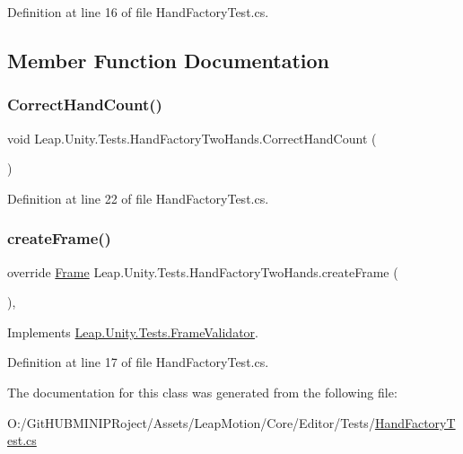 Definition at line 16 of file Hand\+Factory\+Test.\+cs.



\subsection{Member Function Documentation}
\mbox{\label{class_leap_1_1_unity_1_1_tests_1_1_hand_factory_two_hands_acf5d61eadd85814d90e0dd53b014fd6f}} 
\subsubsection{\texorpdfstring{CorrectHandCount()}{CorrectHandCount()}}
{\footnotesize\ttfamily void Leap.\+Unity.\+Tests.\+Hand\+Factory\+Two\+Hands.\+Correct\+Hand\+Count (\begin{DoxyParamCaption}{ }\end{DoxyParamCaption})}



Definition at line 22 of file Hand\+Factory\+Test.\+cs.

\mbox{\label{class_leap_1_1_unity_1_1_tests_1_1_hand_factory_two_hands_ab929744527e15f0ad07ff17d0e867355}} 
\subsubsection{\texorpdfstring{createFrame()}{createFrame()}}
{\footnotesize\ttfamily override \mbox{\hyperlink{class_leap_1_1_frame}{Frame}} Leap.\+Unity.\+Tests.\+Hand\+Factory\+Two\+Hands.\+create\+Frame (\begin{DoxyParamCaption}{ }\end{DoxyParamCaption})\hspace{0.3cm}{\ttfamily [protected]}, {\ttfamily [virtual]}}



Implements \mbox{\hyperlink{class_leap_1_1_unity_1_1_tests_1_1_frame_validator_ae397067480c6fd2183160f048094e466}{Leap.\+Unity.\+Tests.\+Frame\+Validator}}.



Definition at line 17 of file Hand\+Factory\+Test.\+cs.



The documentation for this class was generated from the following file\+:\begin{DoxyCompactItemize}
\item 
O\+:/\+Git\+H\+U\+B\+M\+I\+N\+I\+P\+Roject/\+Assets/\+Leap\+Motion/\+Core/\+Editor/\+Tests/\mbox{\hyperlink{_hand_factory_test_8cs}{Hand\+Factory\+Test.\+cs}}\end{DoxyCompactItemize}
